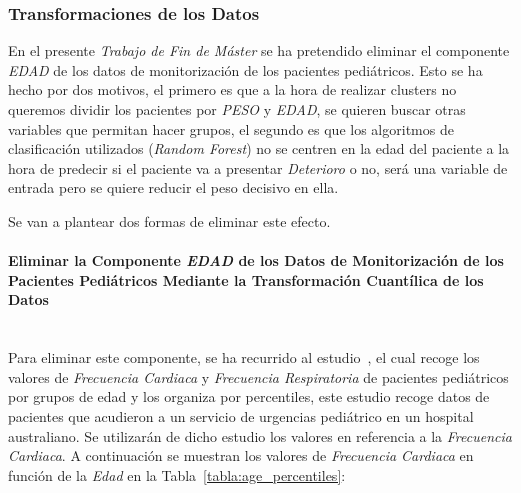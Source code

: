 \subsubsection{Transformaciones de los Datos}\label{sec:transformaciones-de-datos}

En el presente \textit{Trabajo de Fin de Máster} se ha pretendido eliminar el componente \textit{EDAD} de los datos de monitorización de los pacientes pediátricos. Esto se ha hecho por dos motivos, el primero es que a la hora de realizar clusters no queremos dividir los pacientes por \textit{PESO} y \textit{EDAD}, se quieren buscar otras variables que permitan hacer grupos, el segundo es que los algoritmos de clasificación utilizados (\textit{Random Forest}) no se centren en la edad del paciente a la hora de predecir si el paciente va a presentar \textit{Deterioro} o no, será una variable de entrada pero se quiere reducir el peso decisivo en ella.

Se van a plantear dos formas de eliminar este efecto.

\paragraph{Eliminar la Componente \textit{EDAD} de los Datos de Monitorización de los Pacientes Pediátricos Mediante la Transformación Cuantílica de los Datos}\label{sec:eliminar-edad-1} \\

Para eliminar este componente, se ha recurrido al estudio~\cite{percentilesFenton2015}, el cual recoge los valores de \textit{Frecuencia Cardiaca} y \textit{Frecuencia Respiratoria}  de pacientes pediátricos por grupos de edad y los organiza por percentiles, este estudio recoge datos de pacientes que acudieron a un servicio de urgencias pediátrico en un hospital australiano. Se utilizarán de dicho estudio los valores en referencia a la \textit{Frecuencia Cardiaca}. A continuación se muestran los valores de \textit{Frecuencia Cardiaca} en función de la \textit{Edad} en la Tabla~\ref{tabla:age_percentiles}:


